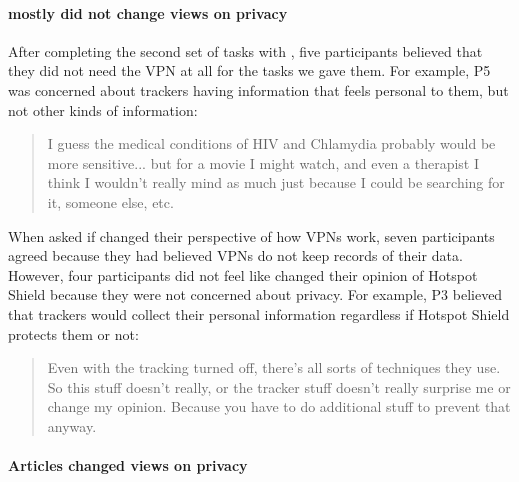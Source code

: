 \paragraph{\tool mostly did not change views on privacy}

After completing the second set of tasks with \tool, five participants believed that they did not need the VPN at all for the tasks we gave them. For example, P5 was concerned about trackers having information that feels personal to them, but not other kinds of information:

\begin{quote}I guess the medical conditions of HIV and Chlamydia probably would be more sensitive... but for a movie I might watch, and even a therapist I think I wouldn't really mind as much just because I could be searching for it, someone else, etc.\end{quote}


When asked if \tool changed their perspective of how VPNs work, seven
participants agreed because they had believed VPNs do not keep records of their data. However, four participants did not feel like \tool changed their opinion of Hotspot Shield because they were not concerned about privacy. For example, P3 believed that trackers would collect their personal information regardless if Hotspot Shield protects them or not:

\begin{quote}Even with the tracking turned off, there's all sorts of techniques they use. So this stuff doesn't really, or the tracker stuff doesn't really surprise me or change my opinion. Because you have to do additional stuff to prevent that anyway.\end{quote}

\paragraph{Articles changed views on privacy}


